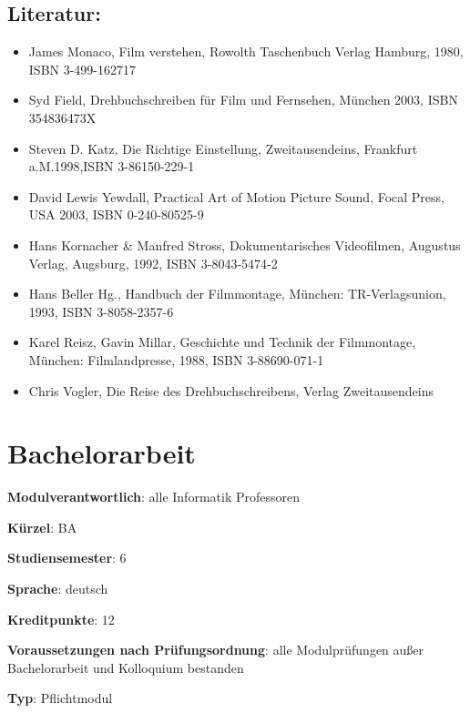 \section*{Literatur:}\label{literatur-2}

\begin{itemize}
\tightlist
\item
  James Monaco, Film verstehen, Rowolth Taschenbuch Verlag Hamburg,
  1980, ISBN 3-499-162717
\item
  Syd Field, Drehbuchschreiben für Film und Fernsehen, München 2003,
  ISBN 354836473X
\item
  Steven D. Katz, Die Richtige Einstellung, Zweitausendeins, Frankfurt
  a.M.1998,ISBN 3-86150-229-1
\item
  David Lewis Yewdall, Practical Art of Motion Picture Sound, Focal
  Press, USA 2003, ISBN 0-240-80525-9
\item
  Hans Kornacher \& Manfred Stross, Dokumentarisches Videofilmen,
  Augustus Verlag, Augsburg, 1992, ISBN 3-8043-5474-2
\item
  Hans Beller Hg., Handbuch der Filmmontage, München: TR-Verlagsunion,
  1993, ISBN 3-8058-2357-6
\item
  Karel Reisz, Gavin Millar, Geschichte und Technik der Filmmontage,
  München: Filmlandpresse, 1988, ISBN 3-88690-071-1
\item
  Chris Vogler, Die Reise des Drehbuchschreibens, Verlag Zweitausendeins
\end{itemize}

\chapter{Bachelorarbeit}\label{bachelorarbeit}

\begin{modulHead}
\textbf{Modulverantwortlich}: alle Informatik
Professoren
\end{modulHead}
\begin{modulHead}
\textbf{Kürzel}:
BA
\end{modulHead}
\begin{modulHead}
\textbf{Studiensemester}:
6
\end{modulHead}
\begin{modulHead}
\textbf{Sprache}:
deutsch
\end{modulHead}
\begin{modulHead}
\textbf{Kreditpunkte}:
12
\end{modulHead}
\begin{modulHead}
\textbf{Voraussetzungen nach
Prüfungsordnung}: alle Modulprüfungen außer Bachelorarbeit und
Kolloquium bestanden
\end{modulHead}
\begin{modulHead}
\textbf{Typ}:
Pflichtmodul
\end{modulHead}


